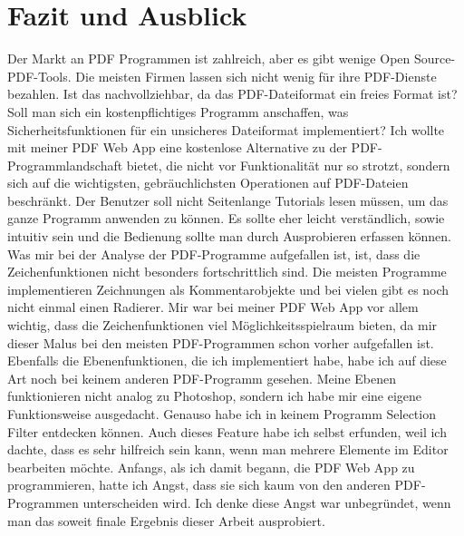 \chapter{Fazit und Ausblick}
Der Markt an PDF Programmen ist zahlreich, aber es gibt wenige Open Source-PDF-Tools. Die meisten Firmen lassen sich nicht wenig für ihre PDF-Dienste bezahlen. Ist das nachvollziehbar, da das PDF-Dateiformat ein freies Format ist? Soll man sich ein kostenpflichtiges Programm anschaffen, was Sicherheitsfunktionen für ein unsicheres Dateiformat implementiert? Ich wollte mit meiner PDF Web App eine kostenlose Alternative zu der PDF-Programmlandschaft bietet, die nicht vor Funktionalität nur so strotzt, sondern sich auf die wichtigsten, gebräuchlichsten Operationen auf PDF-Dateien beschränkt. Der Benutzer soll nicht Seitenlange Tutorials lesen müssen, um das ganze Programm anwenden zu können. Es sollte eher leicht verständlich, sowie intuitiv sein und die Bedienung sollte man durch Ausprobieren erfassen können. Was mir bei der Analyse der PDF-Programme aufgefallen ist, ist, dass die Zeichenfunktionen nicht besonders fortschrittlich sind. Die meisten Programme implementieren Zeichnungen als Kommentarobjekte und bei vielen gibt es noch nicht einmal einen Radierer. Mir war bei meiner PDF Web App vor allem wichtig, dass die Zeichenfunktionen viel Möglichkeitsspielraum bieten, da mir dieser Malus bei den meisten PDF-Programmen schon vorher aufgefallen ist. Ebenfalls die Ebenenfunktionen, die ich implementiert habe, habe ich auf diese Art noch bei keinem anderen PDF-Programm gesehen. Meine Ebenen funktionieren nicht analog zu Photoshop, sondern ich habe mir eine eigene Funktionsweise ausgedacht. Genauso habe ich in keinem Programm Selection Filter entdecken können. Auch dieses Feature habe ich selbst erfunden, weil ich dachte, dass es sehr hilfreich sein kann, wenn man mehrere Elemente im Editor bearbeiten möchte. Anfangs, als ich damit begann, die PDF Web App zu programmieren, hatte ich Angst, dass sie sich kaum von den anderen PDF-Programmen unterscheiden wird. Ich denke diese Angst war unbegründet, wenn man das soweit finale Ergebnis dieser Arbeit ausprobiert.
\par
